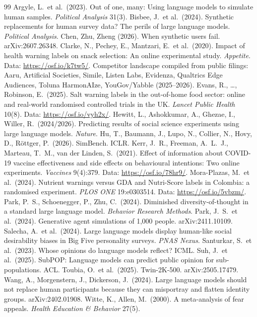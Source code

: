 \documentclass[10pt,twocolumn]{article}
\begin{document}
\small
\begin{thebibliography}{99}\setlength{\itemsep}{0pt}
 Argyle, L.\ et al.\ (2023). Out of one, many: Using language models to simulate human samples. \emph{Political Analysis} 31(3).
 Bisbee, J.\ et al.\ (2024). Synthetic replacements for human survey data? The perils of large language models. \emph{Political Analysis}.
 Chen, Zhu, Zheng (2026). When synthetic users fail. arXiv:2607.26348.
 Clarke, N., Pechey, E., Mantzari, E.\ et al.\ (2020). Impact of health warning labels on snack selection: An online experimental study. \emph{Appetite}. Data: \url{https://osf.io/k7tw5/}.
 Competitor landscape compiled from public filings: Aaru, Artificial Societies, Simile, Listen Labs, Evidenza, Qualtrics Edge Audiences, Toluna HarmonAIze, YouGov/Yabble (2025--2026).
 Evans, R., \dots, Robinson, E.\ (2025). Salt warning labels in the out-of-home food sector: online and real-world randomised controlled trials in the UK. \emph{Lancet Public Health} 10(8). Data: \url{https://osf.io/vyh2x/}.
 Hewitt, L., Ashokkumar, A., Ghezae, I., Willer, R.\ (2024/2026). Predicting results of social science experiments using large language models. \emph{Nature}.
 Hu, T., Baumann, J., Lupo, N., Collier, N., Hovy, D., R\"ottger, P.\ (2026). SimBench. ICLR.
 Kerr, J.\ R., Freeman, A.\ L.\ J., Marteau, T.\ M., van der Linden, S.\ (2021). Effect of information about COVID-19 vaccine effectiveness and side effects on behavioural intentions: Two online experiments. \emph{Vaccines} 9(4):379. Data: \url{https://osf.io/78hr9/}.
 Mora-Plazas, M.\ et al.\ (2024). Nutrient warnings versus GDA and Nutri-Score labels in Colombia: a randomised experiment. \emph{PLOS ONE} 19:e0303514. Data: \url{https://osf.io/5vbzm/}.
 Park, P.\ S., Schoenegger, P., Zhu, C.\ (2024). Diminished diversity-of-thought in a standard large language model. \emph{Behavior Research Methods}.
 Park, J.\ S.\ et al.\ (2024). Generative agent simulations of 1,000 people. arXiv:2411.10109.
 Salecha, A.\ et al.\ (2024). Large language models display human-like social desirability biases in Big Five personality surveys. \emph{PNAS Nexus}.
 Santurkar, S.\ et al.\ (2023). Whose opinions do language models reflect? ICML.
 Suh, J.\ et al.\ (2025). SubPOP: Language models can predict public opinion for sub-populations. ACL.
 Toubia, O.\ et al.\ (2025). Twin-2K-500. arXiv:2505.17479.
 Wang, A., Morgenstern, J., Dickerson, J.\ (2024). Large language models should not replace human participants because they can misportray and flatten identity groups. arXiv:2402.01908.
 Witte, K., Allen, M.\ (2000). A meta-analysis of fear appeals. \emph{Health Education \& Behavior} 27(5).
\end{thebibliography}
\end{document}
